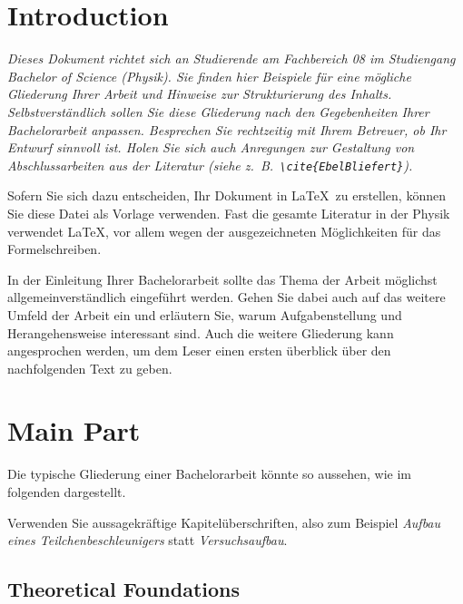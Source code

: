 \documentclass[a4paper,11pt,oneside,final,english,toc=bib]{scrbook}
\begin{document}
\tableofcontents
\clearpage

\mainmatter
\sloppy

% 
\chapter{Introduction}

{\em Dieses Dokument richtet sich an Studierende am Fachbereich 08 im 
Studiengang Bachelor of Science (Physik). Sie finden hier Beispiele 
für eine mögliche Gliederung Ihrer Arbeit und Hinweise zur 
Strukturierung des Inhalts. Selbstverständlich sollen Sie diese 
Gliederung nach den Gegebenheiten Ihrer Bachelorarbeit anpassen. 
Besprechen Sie rechtzeitig mit Ihrem Betreuer, ob Ihr Entwurf sinnvoll 
ist. Holen Sie sich auch Anregungen zur Gestaltung von Abschlussarbeiten 
aus der Literatur (siehe z.\ B.\ \verb|\cite{EbelBliefert}|).
\medskip

Sofern Sie sich dazu entscheiden, Ihr Dokument in \LaTeX\ zu erstellen, 
können Sie diese Datei als Vorlage verwenden. Fast die gesamte 
Literatur in der Physik verwendet \LaTeX, vor allem wegen der 
ausgezeichneten Möglichkeiten für das Formelschreiben.
}
\bigskip

In der Einleitung Ihrer Bachelorarbeit sollte das Thema der Arbeit 
möglichst allgemeinverständlich eingeführt werden. Gehen Sie 
dabei auch auf das weitere Umfeld der Arbeit ein und erläutern Sie, 
warum Aufgabenstellung und Herangehensweise interessant sind. Auch 
die weitere Gliederung kann angesprochen werden, um dem Leser einen 
ersten überblick über den nachfolgenden Text zu geben.

\chapter{Main Part}

Die typische Gliederung einer Bachelorarbeit könnte so aussehen, 
wie im folgenden dargestellt. 
\medskip

Verwenden Sie aussagekräftige Kapitelüberschriften, also zum 
Beispiel {\em Aufbau eines Teilchenbeschleunigers} statt 
{\em Versuchsaufbau}.


\section{Theoretical Foundations}
\end{document}
